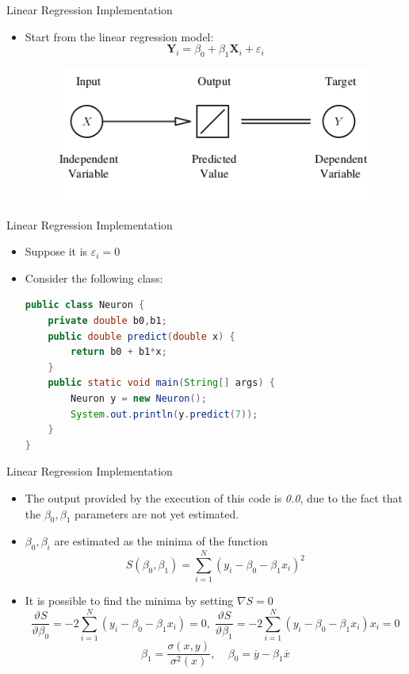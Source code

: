 \documentclass[xcolor ={table,usenames,dvipsnames}]{beamer}
\theoremstyle{definition}
\begin{document}
\begin{frame}{Linear Regression Implementation}
\begin{itemize}
	\item Start from the linear regression model:
	$$
	\textbf{Y}_i = \beta_0 + \beta_1 \textbf{X}_i + \varepsilon_i
	$$
	\begin{figure}[h!]
		\centering
		\includegraphics[scale=2]{../Relazione/img/linreg}
	\end{figure}
\end{itemize}
\end{frame}
\begin{frame}[fragile]{Linear Regression Implementation}
\begin{itemize}
	\item Suppose it is $\varepsilon_i = 0$
	\item Consider the following class:
\begin{lstlisting}[language=Java]
public class Neuron {
	private double b0,b1;
	public double predict(double x) {
		return b0 + b1*x;
	}
	public static void main(String[] args) {
		Neuron y = new Neuron();
		System.out.println(y.predict(7));
	}
}
\end{lstlisting}
\end{itemize}
\end{frame}
\begin{frame}{Linear Regression Implementation}
\begin{itemize}
	\item The output provided by the execution of this code is \textit{0.0}, due to the fact that the $\beta_0,\beta_1$ parameters are not yet estimated.
	\item  $\beta_0,\beta_i$ are estimated as the minima of the function
	$$
	S(\beta_0,\beta_1) = \sum_{i=1}^N (y_i - \beta_0 - \beta_1 x_i)^2
	$$
	\item It is possible to find the minima by setting
	$\nabla S = 0$
	$$
	\frac{\vartheta S}{\vartheta \beta_0} = -2 \sum_{i=1}^N (y_i - \beta_0 - \beta_1x_i) = 0,\;
	\frac{\vartheta S}{\vartheta \beta_1} = -2 \sum_{i=1}^N (y_i - \beta_0 - \beta_1 x_i) x_i = 0
	$$
	$$
	\beta_1 = \frac{\sigma(x,y)}{\sigma^2(x)},\;\;\;\;
	\beta_0 = \overline y - \beta_1 \overline x
	$$
\end{itemize}
\end{frame}
\end{document}
